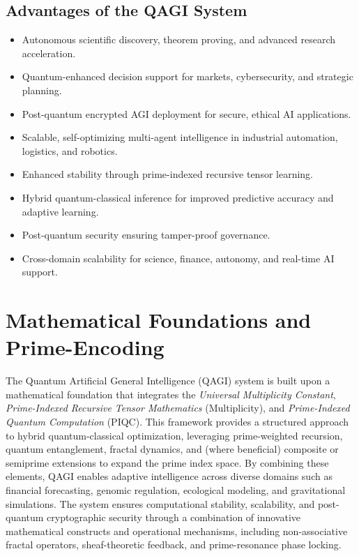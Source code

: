 \documentclass{article}
\theoremstyle{plain}
\theoremstyle{claimstyle}
\begin{document}
\subsection{Advantages of the QAGI System}
\begin{itemize}
\item Autonomous scientific discovery, theorem proving, and advanced research acceleration.
\item Quantum-enhanced decision support for markets, cybersecurity, and strategic planning.
\item Post-quantum encrypted AGI deployment for secure, ethical AI applications.
\item Scalable, self-optimizing multi-agent intelligence in industrial automation, logistics, and robotics.
\item Enhanced stability through prime-indexed recursive tensor learning.
\item Hybrid quantum-classical inference for improved predictive accuracy and adaptive learning.
\item Post-quantum security ensuring tamper-proof governance.
\item Cross-domain scalability for science, finance, autonomy, and real-time AI support.
\end{itemize}

\section{Mathematical Foundations and Prime-Encoding}

The Quantum Artificial General Intelligence (QAGI) system is built upon a mathematical foundation that integrates the \emph{Universal Multiplicity Constant}, \emph{Prime-Indexed Recursive Tensor Mathematics} (Multiplicity), and \emph{Prime-Indexed Quantum Computation} (PIQC). This framework provides a structured approach to hybrid quantum-classical optimization, leveraging prime-weighted recursion, quantum entanglement, fractal dynamics, and (where beneficial) composite or semiprime extensions to expand the prime index space. By combining these elements, QAGI enables adaptive intelligence across diverse domains such as financial forecasting, genomic regulation, ecological modeling, and gravitational simulations. The system ensures computational stability, scalability, and post-quantum cryptographic security through a combination of innovative mathematical constructs and operational mechanisms, including non-associative fractal operators, sheaf-theoretic feedback, and prime-resonance phase locking.
\end{document}
